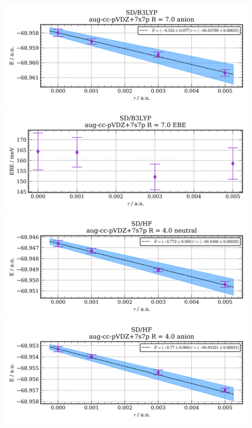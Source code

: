 \includegraphics[width=\textwidth,keepaspectratio]{images/SDshivB3LYP__aug-cc-pvdz+7s7p__7p0_02_anion.png}
\includegraphics[width=\textwidth,keepaspectratio]{images/SDshivB3LYP__aug-cc-pvdz+7s7p__7p0_03_ebe.png}
\includegraphics[width=\textwidth,keepaspectratio]{images/SDshivHF__aug-cc-pvdz+7s7p__4p0_01_neutral.png}
\includegraphics[width=\textwidth,keepaspectratio]{images/SDshivHF__aug-cc-pvdz+7s7p__4p0_02_anion.png}
